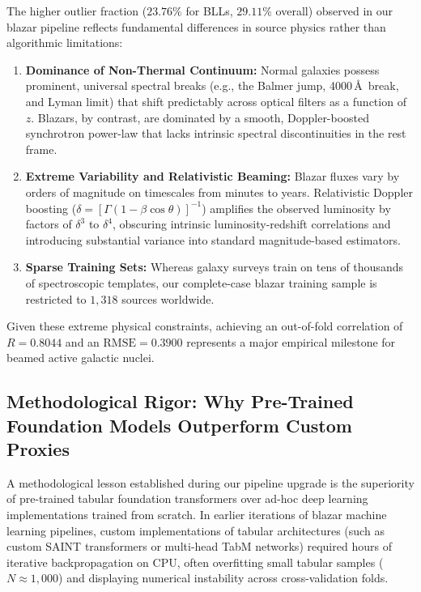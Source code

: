 \documentclass[twocolumn,linenumbers,floatfix]{aastex701}
\begin{document}
The higher outlier fraction ($23.76\%$ for BLLs, $29.11\%$ overall) observed in our blazar pipeline reflects fundamental differences in source physics rather than algorithmic limitations:
\begin{enumerate}
    \item \textbf{Dominance of Non-Thermal Continuum:} Normal galaxies possess prominent, universal spectral breaks (e.g., the Balmer jump, 4000\,\AA\ break, and Lyman limit) that shift predictably across optical filters as a function of $z$. Blazars, by contrast, are dominated by a smooth, Doppler-boosted synchrotron power-law that lacks intrinsic spectral discontinuities in the rest frame.
    \item \textbf{Extreme Variability and Relativistic Beaming:} Blazar fluxes vary by orders of magnitude on timescales from minutes to years. Relativistic Doppler boosting ($\delta = [\Gamma(1 - \beta\cos\theta)]^{-1}$) amplifies the observed luminosity by factors of $\delta^3$ to $\delta^4$, obscuring intrinsic luminosity-redshift correlations and introducing substantial variance into standard magnitude-based estimators.
    \item \textbf{Sparse Training Sets:} Whereas galaxy surveys train on tens of thousands of spectroscopic templates, our complete-case blazar training sample is restricted to $1,318$ sources worldwide.
\end{enumerate}

Given these extreme physical constraints, achieving an out-of-fold correlation of $R = 0.8044$ and an $\text{RMSE} = 0.3900$ represents a major empirical milestone for beamed active galactic nuclei.

\subsection{Methodological Rigor: Why Pre-Trained Foundation Models Outperform Custom Proxies}
\label{subsec:tabular_foundation}

A methodological lesson established during our pipeline upgrade is the superiority of pre-trained tabular foundation transformers over ad-hoc deep learning implementations trained from scratch. In earlier iterations of blazar machine learning pipelines, custom implementations of tabular architectures (such as custom SAINT transformers or multi-head TabM networks) required hours of iterative backpropagation on CPU, often overfitting small tabular samples ($N \approx 1,000$) and displaying numerical instability across cross-validation folds.
\end{document}
